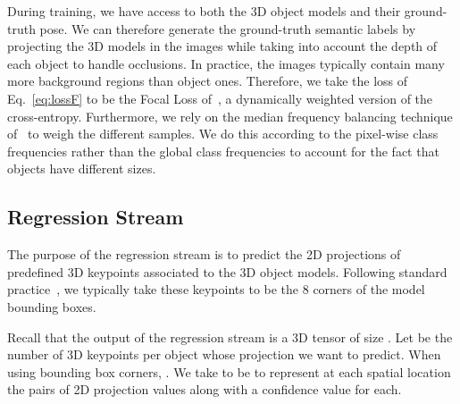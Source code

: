 \documentclass[10pt,twocolumn,letterpaper]{article}
\begin{document}
During training, we have access to both the 3D object models and their ground-truth pose. We can therefore generate the ground-truth semantic labels by projecting the 3D models in the images while taking into account the depth of each object to handle occlusions. In practice, the images typically contain many more background regions than object ones. Therefore, we take the loss  of Eq.~\ref{eq:lossF} to be the Focal Loss of~\cite{Lin17}, a dynamically weighted version of the cross-entropy. Furthermore, we rely on the median frequency balancing technique of~\cite{Eigen15,Badrinarayanan15} to weigh the different samples. We do this according to the pixel-wise class frequencies rather than the global class frequencies to account for the fact that objects have different sizes.

\subsection{Regression Stream}
\label{sec:reg}

The purpose of the regression stream is to predict the 2D projections of predefined 3D keypoints associated to the 3D object models. Following standard practice~\cite{Rad17,Grabner18,Rad18}, we typically take these keypoints to be the 8 corners of the model bounding boxes. 

Recall that the output of the regression stream is a 3D tensor of size . Let  be the number of 3D keypoints per object whose projection we want to predict. When using bounding box corners, .
We take  to be  to represent at each spatial location the  pairs of 2D projection values along with a confidence value for each. 
\end{document}

